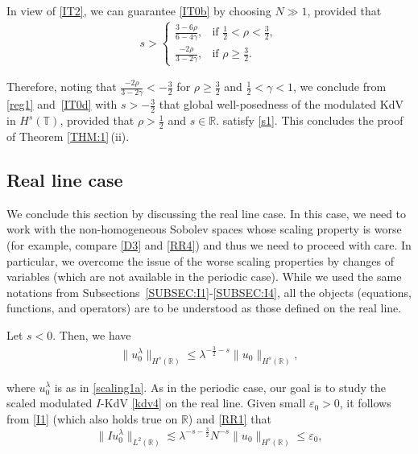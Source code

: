 \documentclass[letterpaper, 11pt,  reqno]{amsart}
\newcommand{\1}{\hspace{0.5mm}\text{I}\hspace{0.5mm}}
\newcommand{\noi}{\noindent}
\newcommand{\R}{\mathbb{R}}
\newcommand{\T}{\mathbb{T}}
\newcommand{\eps}{\varepsilon}
\newcommand{\g}{\gamma}
\newcommand{\ld}{\lambda}
\newcommand{\les}{\lesssim}
\numberwithin{equation}{section}
\numberwithin{theorem}{section}
\begin{document}
\noi
In view of  \eqref{IT2}, 
we  can  guarantee \eqref{IT0b} by choosing $N \gg 1$, 
provided that 
\begin{align}
s > 
\begin{cases}
\frac {3-6\rho }{6 - 4\g}, & \text{if } \frac 12 < \rho < \frac 32, \\
\frac {-2\rho}{3 - 2\g}, & \text{if }  \rho \ge \frac 32.
\end{cases}
\label{IT0d}
\end{align}

\noi
Therefore, noting that 
$\frac{-2\rho}{3 - 2\g}  < -\frac 32$ for 
 $\rho \ge \frac 32$ and
$ \frac 12< \g < 1$, 
we conclude 
from \eqref{reg1} and~\eqref{IT0d} with $ s > - \frac 32$
that 
global well-posedness of the modulated KdV in $H^s(\T)$, 
provided that 
$\rho > \frac 12$ and $s\in \R$.
satisfy \eqref{s1}.
This concludes the proof of Theorem \ref{THM:1}\,(ii).








\subsection{Real line case}
\label{SUBSEC:I5}


We conclude this section by discussing the real line case.
In this case, we need to work with the non-homogeneous Sobolev spaces whose
scaling property is worse
(for example, compare \eqref{D3} and \eqref{RR4})
and thus we need to proceed with care.
In particular, we overcome the issue of the worse scaling properties
by changes of variables
(which are not available in the periodic case).
While we used the same notations from Subsections~\ref{SUBSEC:I1}-\ref{SUBSEC:I4}, 
 all the objects 
(equations, functions, and operators) are 
to be understood as those defined on the real line.






Let $s < 0$.
Then, we have 
\begin{align}
\|u_0^\ld\|_{ H^s(\R)}
\le  \ld^{-\frac 32 - s} \|u_0\|_{ H^s(\R)}, 
\label{RR1}
\end{align}

\noi
where $u_0^\ld$ is as in \eqref{scaling1a}.
As in the periodic case, 
our goal is to study the scaled modulated $I$-KdV \eqref{kdv4}
on the real line.
Given small $\eps_0 > 0$, it follows from 
\eqref{I1} (which also holds true on $\R$)
and  \eqref{RR1} that
\begin{equation*}
 \| I  u_0^{\ld} \|_{L^2(\R) }
 \les \ld^{-s-\frac 32} N^{-s} \|  u_0  \|_{H^{s}(\R)}
 \le \eps_0 , 
\end{equation*}
\end{document}
